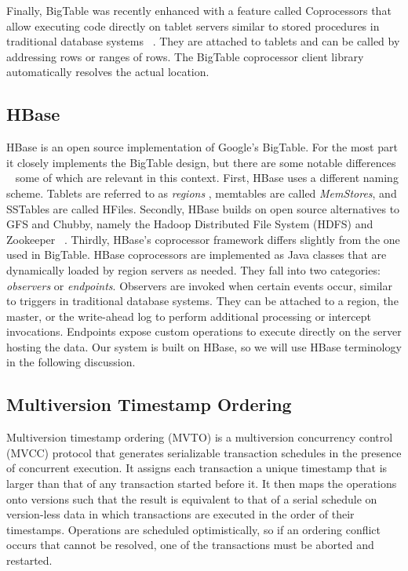 \documentclass[10pt,final,journal]{IEEEtran}
\begin{document}
Finally, BigTable was recently enhanced with a feature called Coprocessors that allow executing code directly on tablet servers similar to stored procedures in traditional database systems ~\cite{Dean:2009}. They are attached to tablets and can be called by addressing rows or ranges of rows. The BigTable coprocessor client library automatically resolves the actual location.

\subsection{HBase}
HBase is an open source implementation of Google's BigTable. For the most part it closely implements the BigTable design, but there are some notable differences ~\cite{George:2011} some of which are relevant in this context. First, HBase uses a different naming scheme. Tablets are referred to as \emph{regions }, memtables are called \emph{MemStores}, and SSTables are called HFiles. Secondly, HBase builds on open source alternatives to GFS and Chubby, namely the Hadoop Distributed File System (HDFS) and Zookeeper ~\cite{Hunt:2010:ZWC:1855840.1855851}.
Thirdly, HBase's coprocessor framework differs slightly from the one used in BigTable. HBase coprocessors are implemented as Java classes that are dynamically loaded by region servers as needed. They fall into two categories: \emph{observers} or \emph{endpoints}. Observers are invoked when certain events occur, similar to triggers in traditional database systems. They can be attached to a region, the master, or the write-ahead log to perform additional processing or intercept invocations. Endpoints expose custom operations to execute directly on the server hosting the data.
Our system is built on HBase, so we will use HBase terminology in the following discussion.

\subsection{Multiversion Timestamp Ordering}
Multiversion timestamp ordering (MVTO) is a multiversion concurrency control (MVCC) protocol that generates serializable transaction schedules in the presence of concurrent execution. It assigns each transaction a unique timestamp that is larger than that of any transaction started before it. It then maps the operations onto versions such that the result is equivalent to that of a serial schedule on version-less data in which transactions are executed in the order of their timestamps. Operations are scheduled optimistically, so if an ordering conflict occurs that cannot be resolved, one of the transactions must be aborted and restarted.
\end{document}
